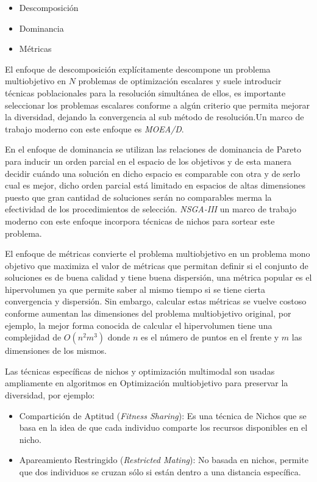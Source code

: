 \documentclass[letterpaper,10pt]{article}
\begin{document}
\begin{itemize}
 \item Descomposición
 \item Dominancia
 \item Métricas
\end{itemize}

El enfoque de descomposición explícitamente descompone un problema multiobjetivo en $N$ problemas de optimización escalares y suele introducir técnicas poblacionales para la resolución simultánea de ellos, es importante seleccionar los problemas escalares conforme a algún criterio que permita mejorar la diversidad, dejando la convergencia al sub método de resolución.Un marco de trabajo moderno con este enfoque es \emph{MOEA/D}\cite{4358754}.
\newline

En el enfoque de dominancia se utilizan las relaciones de dominancia de Pareto para inducir un orden parcial en el espacio de los objetivos y de esta manera decidir cuándo una solución en dicho espacio es comparable con otra y de serlo cual es mejor, dicho orden parcial está limitado en espacios de altas dimensiones puesto que gran cantidad de soluciones serán no comparables merma la efectividad de los procedimientos de selección. \emph{NSGA-III} un marco de trabajo moderno con este enfoque incorpora técnicas de nichos para sortear este problema.
\newline

El enfoque de métricas convierte el problema multiobjetivo en un problema mono objetivo que maximiza el valor de métricas que permitan definir si el conjunto de soluciones es de buena calidad y  tiene buena dispersión, una métrica popular es el hipervolumen ya que permite saber al mismo tiempo si se tiene cierta convergencia y dispersión. Sin embargo, calcular estas métricas se vuelve costoso conforme aumentan las dimensiones del problema multiobjetivo original, por ejemplo, la mejor forma conocida de calcular el hipervolumen tiene una complejidad de $O(n^2m^3)$ donde $n$ es el número de puntos en el frente y $m$ las dimensiones de los mismos.
\newline

Las técnicas específicas de nichos y optimización multimodal son usadas ampliamente en algoritmos en Optimización multiobjetivo para preservar la diversidad, por ejemplo:
 \begin{itemize}
  \item Compartición de Aptitud ({\em Fitness Sharing}): Es una técnica de Nichos que se basa en la idea de que cada individuo comparte los recursos disponibles en el nicho.
  \item Apareamiento Restringido ({\em Restricted Mating}): No basada en nichos, permite que dos individuos se cruzan sólo si están dentro a una distancia específica.  
 \end{itemize}
 
\end{document}
